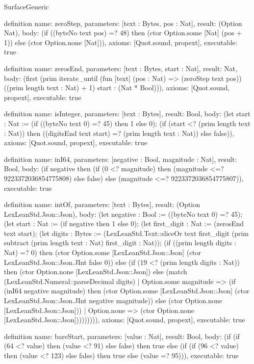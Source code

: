 \begin{lexlean}{SurfaceGeneric}
\begin{semanticmodule}
definition{
  name: zeroStep,
  parameters: [text : Bytes, pos : Nat],
  result: (Option Nat),
  body: (if ((byteNo text pos) =? 48) then (ctor Option.some [Nat] (pos + 1)) else (ctor Option.none [Nat])),
  axioms: [Quot.sound, propext],
  executable: true
}

definition{
  name: zerosEnd,
  parameters: [text : Bytes, start : Nat],
  result: Nat,
  body: (first (prim iterate_until (fun [text] (pos : Nat) => (zeroStep text pos)) ((prim length text : Nat) + 1) start : (Nat * Bool))),
  axioms: [Quot.sound, propext],
  executable: true
}

definition{
  name: isInteger,
  parameters: [text : Bytes],
  result: Bool,
  body: (let start : Nat := (if ((byteNo text 0) =? 45) then 1 else 0); (if (start <? (prim length text : Nat)) then ((digitsEnd text start) =? (prim length text : Nat)) else false)),
  axioms: [Quot.sound, propext],
  executable: true
}

definition{
  name: inI64,
  parameters: [negative : Bool, magnitude : Nat],
  result: Bool,
  body: (if negative then (if (0 <? magnitude) then (magnitude <=? 9223372036854775808) else false) else (magnitude <=? 9223372036854775807)),
  executable: true
}

definition{
  name: intOf,
  parameters: [text : Bytes],
  result: (Option LexLeanStd.Json::Json),
  body: (let negative : Bool := ((byteNo text 0) =? 45); (let start : Nat := (if negative then 1 else 0); (let first_digit : Nat := (zerosEnd text start); (let digits : Bytes := (LexLeanStd.Text::sliceOr text first_digit (prim subtract (prim length text : Nat) first_digit : Nat)); (if ((prim length digits : Nat) =? 0) then (ctor Option.some [LexLeanStd.Json::Json] (ctor LexLeanStd.Json::Json.JInt false 0)) else (if (19 <? (prim length digits : Nat)) then (ctor Option.none [LexLeanStd.Json::Json]) else (match (LexLeanStd.Numeral::parseDecimal digits)
    | Option.some magnitude => (if (inI64 negative magnitude) then (ctor Option.some [LexLeanStd.Json::Json] (ctor LexLeanStd.Json::Json.JInt negative magnitude)) else (ctor Option.none [LexLeanStd.Json::Json]))
    | Option.none => (ctor Option.none [LexLeanStd.Json::Json])))))))),
  axioms: [Quot.sound, propext],
  executable: true
}

definition{
  name: bareStart,
  parameters: [value : Nat],
  result: Bool,
  body: (if (if (64 <? value) then (value <? 91) else false) then true else (if (if (96 <? value) then (value <? 123) else false) then true else (value =? 95))),
  executable: true
}


\end{semanticmodule}
\end{lexlean}
